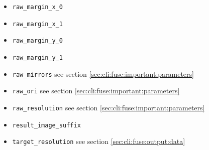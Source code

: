 \begin{itemize}
\item \texttt{raw\_margin\_x\_0}
\item \texttt{raw\_margin\_x\_1}
\item \texttt{raw\_margin\_y\_0}
\item \texttt{raw\_margin\_y\_1}
\item \texttt{raw\_mirrors} see section \ref{sec:cli:fuse:important:parameters}
\item \texttt{raw\_ori} see section \ref{sec:cli:fuse:important:parameters}
\item \texttt{raw\_resolution} see section \ref{sec:cli:fuse:important:parameters}
\item \texttt{result\_image\_suffix}
\item \texttt{target\_resolution} see section \ref{sec:cli:fuse:output:data}
\end{itemize}
